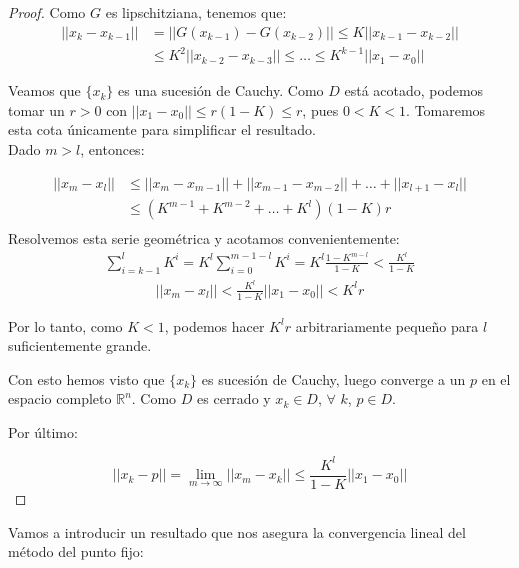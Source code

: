 \begin{proof}
	Como $G$ es lipschitziana, tenemos que:
	\begin{align*}
	|| x_{k} - x_{k-1} || & = || G(x_{k-1}) - G(x_{k-2}) || \leq K || x_{k-1} - x_{k-2} || \\
	& \leq K^2|| x_{k-2} -  x_{k-3} || \leq \ldots \leq K^{k-1}|| x_{1} - x_{0} ||
	\end{align*}

	Veamos que $\{x_{k}\}$ es una sucesión de Cauchy. Como $D$ está acotado, podemos tomar un $r > 0$ con $||x_{1} - x_{0}||\leq r(1-K) \leq r$, pues $0 < K < 1$. Tomaremos esta cota únicamente para simplificar el resultado. \\
 	Dado $m>l$, entonces:

	\begin{align*}
	||x_{m}-x_{l}||& \leq ||x_{m} - x_{m-1}|| + ||x_{m-1} - x_{m-2}|| +  \ldots+||x_{l+1} -  x_{l}||\\
	& \leq (K^{m-1} + K^{m-2} + \ldots + K^l) (1-K)r \\
	\end{align*}
	Resolvemos esta serie geométrica y acotamos convenientemente:
	\begin{align*}
	\sum_{i = k-1}^{l} K^{i} = K^{l} \sum_{i = 0}^{m-1-l} K^{i} = K^{l}\frac{1-K^{m-l}}{1-K} < \frac{K^{l}}{1-K}
	\end{align*}
	\begin{align*}
	||x_{m}-x_{l}|| < \frac{K^{l}}{1-K} ||x_{1}-x_{0}|| < K^{l} r
	\end{align*}

	Por lo tanto, como $K<1$, podemos hacer $K^lr$ arbitrariamente pequeño para $l$ suficientemente grande.
	
	Con esto hemos visto que $\{x_{k}\}$ es sucesión de Cauchy, luego converge a un $p$ en el espacio completo $\mathbb{R}^{n}$. Como $D$ es cerrado y $x_{k} \in D$, $\forall$ $k$, $p \in D$.
	
	Por último:
	
	\[||x_{k}-p|| = \lim_{m \to \infty} ||x_{m}-x_{k}|| \leq \frac{K^l}{1-K}||x_{1}-x_{0}||\]
\end{proof}

Vamos a introducir un resultado que nos asegura la convergencia lineal del método del punto fijo:


